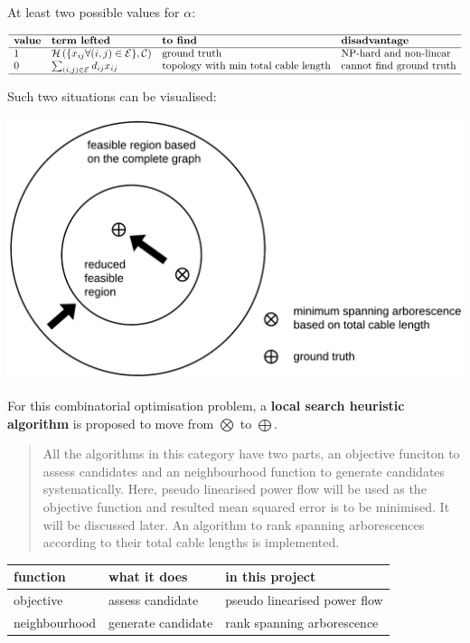 \documentclass[
]{book}
\begin{document}
At least two possible values for \(\alpha\):

\[
\begin{array}{llll}
  \hline
  \textbf{value} & \textbf{term lefted} & \textbf{to find}
  & \textbf{disadvantage} \\
  \hline
  1
  & \mathcal{H}
  \left(\{x_{i j} \forall (i, j) \in \mathcal{E} \}, \mathcal{C} \right)
  & \text{ground truth}
  & \text{NP-hard and non-linear} \\
  0
  & \sum_{(i, j) \in \mathcal{E}} d_{i j} x_{i j}
  & \text{topology with min total cable length}
  & \text{cannot find ground truth} \\
  \hline
\end{array}
\]

Such two situations can be visualised:

\begin{center}\includegraphics[width=0.7\linewidth]{Pictures/figFeasibleRegion} \end{center}

For this combinatorial optimisation problem, a \textbf{local search heuristic
algorithm} is proposed to move from \(\bigotimes\) to \(\bigoplus\).
\citep{michiels2007theoretical}

\begin{quote}
All the algorithms in this category have two parts, an objective funciton to
assess candidates and an neighbourhood function to generate candidates
systematically. Here, pseudo linearised power flow will be used as the
objective function and resulted mean squared error is to be minimised. It
will be discussed later. An algorithm to rank spanning arborescences
according to their total cable lengths is implemented.
\end{quote}

\begin{table}[H]
\centering
\begin{tabular}[t]{l|l|l}
\hline
function & what it does & in this project\\
\hline
objective & assess candidate & pseudo linearised power flow\\
\hline
neighbourhood & generate candidate & rank spanning arborescence\\
\hline
\end{tabular}
\end{table}
\end{document}
